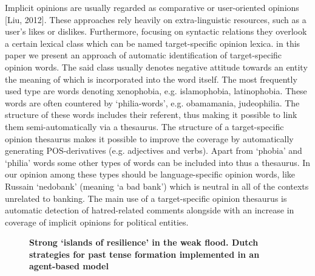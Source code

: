 \documentclass[10pt, a4paper, twopage, headinclude, footinclude, BCOR5mm]{scrartcl}
\begin{document}
{{\noindent
Implicit opinions are usually regarded as comparative or user-oriented opinions [Liu, 2012]. These approaches rely heavily on extra-linguistic resources, such as a user's likes or dislikes. Furthermore, focusing on syntactic relations they overlook a certain lexical class which can be named target-specific opinion lexica. in this paper we present an approach of automatic identification of target-specific opinion words. The said class usually denotes negative attitude towards an entity the meaning of which is incorporated into the word itself. The most frequently used type are words denoting xenophobia, e.g. islamophobia, latinophobia. These words are often countered by `philia-words', e.g. obamamania, judeophilia. The structure of these words includes their referent, thus making it possible to link them semi-automatically via a thesaurus. The structure of a target-specific opinion thesaurus makes it possible to improve the coverage by automatically generating POS-derivatives (e.g. adjectives and verbs). Apart from `phobia' and `philia' words some other types of words can be included into thus a thesaurus. In our opinion among these types should be language-specific opinion words, like Russain `nedobank' (meaning `a bad bank') which is neutral in all of the contexts unrelated to banking. The main use of a target-specific opinion thesaurus is automatic detection of hatred-related comments alongside with an increase in coverage of implicit opinions for political entities.


\newpage

\begin{figure}[t!]
\centering
\large\textbf{Strong ‘islands of resilience’ in the weak flood. Dutch strategies for past tense formation implemented in an agent-based model}
\vspace*{0.5cm}
\end{figure}


        \begin{table}[t!]
    \end{table}

}}
\end{document}
